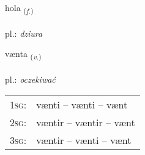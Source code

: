 \documentclass[frontgrid, backgrid]{flacards}\usepackage[]{graphicx}\usepackage[]{xcolor}
\begin{document}
\renewcommand{\flhead}{\vskip5pt \fboxsep=0pt {\small\bfseries\footnotesize Nafnorð | Noun}}
\renewcommand{\fcfoot}{\vskip5pt \fboxsep=0pt \hspace{2pt}{\small\bfseries\footnotesize 2K}}

\renewcommand{\blhead}{\vskip5pt {\small\bfseries\footnotesize Nafnorð | Noun }}
\renewcommand{\bcfoot}{\vskip5pt \hspace{2pt}{\small\bfseries\footnotesize 2K}}


{hola \small{\textsubscript{(\textit{f.})}} \\[1ex] %
\textphonetic{[hɔːla]} \\
pl.: \emph{dziura} \\  [2ex]
\renewcommand*{\arraystretch}{0.8}
}

\renewcommand{\flhead}{\vskip5pt \fboxsep=0pt {\small\bfseries\footnotesize Sagnorð | Verb}}
\renewcommand{\fcfoot}{\vskip5pt \fboxsep=0pt \hspace{2pt}{\small\bfseries\footnotesize 2K}}

\renewcommand{\blhead}{\vskip5pt {\small\bfseries\footnotesize Sagnorð | Verb }}
\renewcommand{\bcfoot}{\vskip5pt \hspace{2pt}{\small\bfseries\footnotesize 2K}}


{vænta \small{\textsubscript{(\textit{v.})}} \\[1ex] %
\textphonetic{[vain̥ta]} \\
pl.: \emph{oczekiwać} \\  [2ex]
\renewcommand*{\arraystretch}{0.8}
\begin{tabular}{p{1cm}l}
\textsc{1sg}: & vænti -- vænti -- vænt \\ 
\textsc{2sg}: & væntir -- væntir -- vænt \\ 
\textsc{3sg}: & væntir -- vænti -- vænt \\ 
\end{tabular}
}
\end{document}
